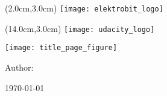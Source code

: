 % 
% 
%



\newlength{\tmpbaselineskip}
\setlength{\tmpbaselineskip}{\baselineskip}
\setlength{\baselineskip}{13.6pt}
\newlength{\tmpparindent}
\setlength{\tmpparindent}{\parindent}
\setlength{\parindent}{17pt}

\thispagestyle{udacitytitlepage}

\begin{textblock*}{20.0cm}(2.0cm,3.0cm) %
	\texttt{[image: elektrobit\_logo]}
\end{textblock*}

\begin{textblock*}{20.0cm}(14.0cm,3.0cm) %
	\texttt{[image: udacity\_logo]}
\end{textblock*}

\begin{center}

\vspace*{8.0cm}

\vspace{-0.2cm}

\vspace{-0.2cm}

\vspace{0.2cm}

\texttt{[image: title\_page\_figure]}

\end{center}

\begin{center}
\vspace{2.2cm}
{\Large{Author:}}
\vspace{0.2cm}

{\Large{\Author}}

\vspace{2.0cm}
{\normalsize{\today}}
\end{center}

\setlength{\baselineskip}{\tmpbaselineskip}
\setlength{\parindent}{\tmpparindent}

\restoregeometry
